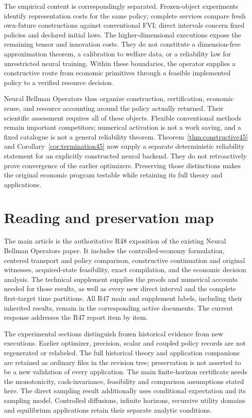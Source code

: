 \documentclass[ecta,nameyear,draft]{econsocart}
\begin{document}
The empirical content is correspondingly separated. Frozen-object experiments identify representation costs for the same policy; complete services compare fresh own-future constructions against conventional FVI; direct intervals concern fixed policies and declared initial laws. The higher-dimensional executions expose the remaining tensor and innovation costs. They do not constitute a dimension-free approximation theorem, a calibration to welfare data, or a reliability law for unrestricted neural training. Within these boundaries, the operator supplies a constructive route from economic primitives through a feasible implemented policy to a verified resource decision.

Neural Bellman Operators thus organize construction, certification, economic reuse, and resource accounting around the policy actually returned. Their scientific assessment requires all of these objects. Flexible conventional methods remain important competitors; numerical activation is not a work saving, and a fixed catalogue is not a general reliability theorem. Theorem~\ref{thm:constructive45} and Corollary~\ref{cor:termination45} now supply a separate deterministic reliability statement for an explicitly constructed neural backend. They do not retroactively prove convergence of the earlier optimizers. Preserving those distinctions makes the original economic program testable while retaining its full theory and applications.

\appendix
\section{Reading and preservation map}\label{app:map}
The main article is the authoritative R48 exposition of the existing Neural Bellman Operators paper. It includes the controlled-economy formulation, centered transport and policy comparison, constructive continuation and original witnesses, acquired-state feasibility, exact compilation, and the economic decision analysis. The technical supplement supplies the proofs and numerical accounts needed for those results, as well as every new direct interval and the complete first-target time partitions. All R47 main and supplement labels, including their inherited results, remain in the corresponding active documents. The current response addresses the R47 report item by item.

The experimental sections distinguish frozen historical evidence from new executions. Earlier optimizer, precision, scalar and coupled policy records are not regenerated or relabeled. The full historical theory and application companions are retained as ordinary files in the revision tree; preservation is not asserted to be a new validation of every application. The main finite-horizon certificate needs the monotonicity, cash-invariance, feasibility and comparison assumptions stated here. The direct sampling result additionally uses conditional expectation and its sampling model. Controlled diffusions, infinite horizons, recursive utility domains and equilibrium applications retain their separate analytic conditions.
\end{document}
